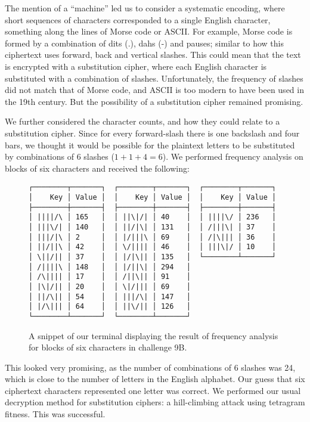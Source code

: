 The mention of a \enquote{machine} led us to consider a systematic encoding, where short sequences of characters corresponded to a single English character, something along the lines of Morse code or ASCII. For example, Morse code is formed by a combination of dits (.), dahs (-) and pauses; similar to how this ciphertext uses forward, back and vertical slashes. This could mean that the text is encrypted with a substitution cipher, where each English character is substituted with a combination of slashes. Unfortunately, the frequency of slashes did not match that of Morse code, and ASCII is too modern to have been used in the 19th century. But the possibility of a substitution cipher remained promising.

We further considered the character counts, and how they could relate to a substitution cipher. Since for every forward-slash there is one backslash and four bars, we thought it would be possible for the plaintext letters to be substituted by combinations of 6 slashes (\(1+1+4=6\)). We performed frequency analysis on blocks of six characters and received the following:

\begin{figure}[H]
\centering
\begin{minipage}{56ex}
\begin{verbatim}        
┌────────┬───────┐  ┌────────┬───────┐  ┌────────┬───────┐
│    Key │ Value │  │    Key │ Value │  │    Key │ Value │
├────────┼───────┤  ├────────┼───────┤  ├────────┼───────┤
│ ||||/\ │ 165   │  │ ||\|/| │ 40    │  │ ||||\/ │ 236   │
│ |||\/| │ 140   │  │ ||/|\| │ 131   │  │ /|||\| │ 37    │
│ |||/|\ │ 2     │  │ |/|||\ │ 69    │  │ /|\||| │ 36    │
│ ||/||\ │ 42    │  │ \/|||| │ 46    │  │ |||\|/ │ 10    │
│ \||/|| │ 37    │  │ |/|\|| │ 135   │  └────────┴───────┘
│ /||||\ │ 148   │  │ |/||\| │ 294   │
│ /\|||| │ 17    │  │ /||\|| │ 91    │
│ |\|/|| │ 20    │  │ \|/||| │ 69    │
│ ||/\|| │ 54    │  │ |||/\| │ 147   │
│ |/\||| │ 64    │  │ ||\/|| │ 126   │
└────────┴───────┘  └────────┴───────┘
\end{verbatim}
\end{minipage}
\label{fig:char_count_9b_length6}
\caption{A snippet of our terminal displaying the result of frequency analysis for blocks of six characters in challenge 9B.}
\end{figure}

This looked very promising, as the number of combinations of 6 slashes was 24, which is close to the number of letters in the English alphabet. Our guess that six ciphertext characters represented one letter was correct. We performed our usual decryption method for substitution ciphers: a hill-climbing attack using tetragram fitness. This was successful.


